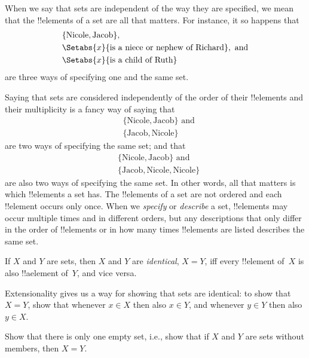 \documentclass[../../../include/open-logic-section]{subfiles}
\begin{document}
\begin{explain}
When we say that sets are independent of the way they are specified,
we mean that the !!{element}s of a set are all that matters. For instance,
it so happens that
\begin{align*}
  & \{\text{Nicole}, \text{Jacob}\},\\
  & \Setabs{x}{\text{is a niece or nephew of Richard}}, \text{ and}\\
  & \Setabs{x}{\text{is a child of Ruth}}
\end{align*}
are three ways of specifying one and the same set.

Saying that sets are considered independently of the order of their
!!{element}s and their multiplicity is a fancy way of saying that
\begin{align*}
  & \{\text{Nicole}, \text{Jacob}\} \text{ and}\\
  & \{\text{Jacob}, \text{Nicole}\}
\end{align*}
are two ways of specifying the same set; and that
\begin{align*}
  & \{\text{Nicole}, \text{Jacob}\} \text{ and}\\
  & \{\text{Jacob}, \text{Nicole}, \text{Nicole}\}
\end{align*}
are also two ways of specifying the same set. In other words, all
that matters is which !!{element}s a set has. The !!{element}s of a
set are not ordered and each !!{element} occurs only once. When we
\emph{specify} or \emph{describe} a set, !!{element}s may occur
multiple times and in different orders, but any descriptions that only
differ in the order of !!{element}s or in how many times !!{element}s
are listed describes the same set.
\end{explain}

\begin{defn}[Extensionality]
  If $X$ and $Y$ are sets, then $X$ and $Y$ are \emph{identical}, $X =
  Y$, iff every !!{element} of~$X$ is also !!a{element} of~$Y$, and
  vice versa.
\end{defn}

\begin{explain}
Extensionality gives us a way for showing that sets are identical: to
show that $X = Y$, show that whenever $x \in X$ then also $x \in Y$,
and whenever $y \in Y$ then also $y \in X$.
\end{explain}

\begin{prob}
Show that there is only one empty set, i.e., show that if $X$ and $Y$
are sets without members, then $X = Y$.
\end{prob}
\end{document}
